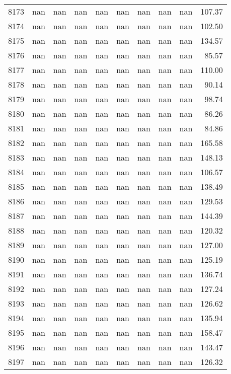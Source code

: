\begin{tabular}{lrrrrrrrrr}
8173 & nan & nan & nan & nan & nan & nan & nan & nan & 107.37 \\
8174 & nan & nan & nan & nan & nan & nan & nan & nan & 102.50 \\
8175 & nan & nan & nan & nan & nan & nan & nan & nan & 134.57 \\
8176 & nan & nan & nan & nan & nan & nan & nan & nan & 85.57 \\
8177 & nan & nan & nan & nan & nan & nan & nan & nan & 110.00 \\
8178 & nan & nan & nan & nan & nan & nan & nan & nan & 90.14 \\
8179 & nan & nan & nan & nan & nan & nan & nan & nan & 98.74 \\
8180 & nan & nan & nan & nan & nan & nan & nan & nan & 86.26 \\
8181 & nan & nan & nan & nan & nan & nan & nan & nan & 84.86 \\
8182 & nan & nan & nan & nan & nan & nan & nan & nan & 165.58 \\
8183 & nan & nan & nan & nan & nan & nan & nan & nan & 148.13 \\
8184 & nan & nan & nan & nan & nan & nan & nan & nan & 106.57 \\
8185 & nan & nan & nan & nan & nan & nan & nan & nan & 138.49 \\
8186 & nan & nan & nan & nan & nan & nan & nan & nan & 129.53 \\
8187 & nan & nan & nan & nan & nan & nan & nan & nan & 144.39 \\
8188 & nan & nan & nan & nan & nan & nan & nan & nan & 120.32 \\
8189 & nan & nan & nan & nan & nan & nan & nan & nan & 127.00 \\
8190 & nan & nan & nan & nan & nan & nan & nan & nan & 125.19 \\
8191 & nan & nan & nan & nan & nan & nan & nan & nan & 136.74 \\
8192 & nan & nan & nan & nan & nan & nan & nan & nan & 127.24 \\
8193 & nan & nan & nan & nan & nan & nan & nan & nan & 126.62 \\
8194 & nan & nan & nan & nan & nan & nan & nan & nan & 135.94 \\
8195 & nan & nan & nan & nan & nan & nan & nan & nan & 158.47 \\
8196 & nan & nan & nan & nan & nan & nan & nan & nan & 143.47 \\
8197 & nan & nan & nan & nan & nan & nan & nan & nan & 126.32 \\

\end{tabular}
